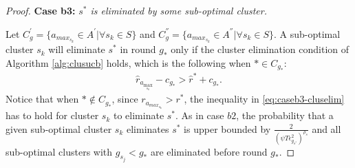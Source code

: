 \begin{proof}
\textbf{Case b3:} \textit{$s^{*}$ is eliminated by some sub-optimal cluster.} 

Let $C_{g}^{'}=\lbrace a_{max_{s_{k}}}\in A^{'}|\forall s_{k}\in S \rbrace$ and $C_{g}^{''}=\lbrace a_{max_{s_{k}}}\in A^{''}|\forall s_{k}\in S \rbrace$. A sub-optimal cluster $s_k$ will eliminate $s^*$ in round $g_*$ only if the cluster elimination condition of Algorithm \ref{alg:clusucb} holds, which is the following when ${*}\in C_{g_{*}}$:
\begin{align}
\hat r_{a_{\max_{s_k}}} - c_{g_{*}} > \hat{r}^{*}+ c_{g_{*}}.
\label{eq:caseb3-cluselim}
\end{align}
Notice that when ${*}\notin C_{g_{*}}$, since $r_{a_{max_{s_{k}}}}>r^{*}$, the inequality in \eqref{eq:caseb3-cluselim} has to hold for cluster $s_k$ to eliminate $s^*$.
As in case $b2$, the probability that a given sub-optimal cluster $s_k$ eliminates $s^*$ is upper bounded by  $\frac{2}{(\psi T\epsilon_{g_{s^{*}}}^{2})^{\rho_{s}}}$ and all sub-optimal clusters with $g_{s_{j}}< g_{*}$ are eliminated before round $g_*$. 


\end{proof}
